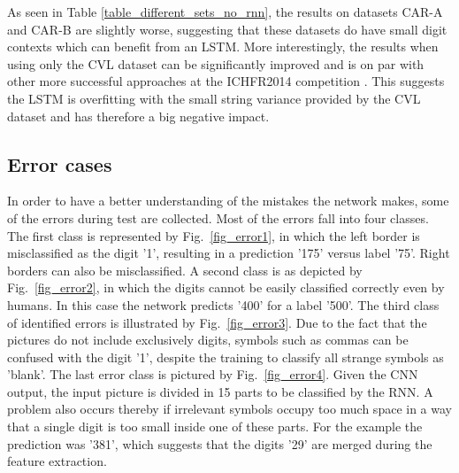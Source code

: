 As seen in Table \ref{table_different_sets_no_rnn}, the results on datasets CAR-A and CAR-B are slightly worse, suggesting that these datasets do have small digit contexts which can benefit from an LSTM. More interestingly, the results when using only the CVL dataset can be significantly improved and is on par with other more successful approaches at the ICHFR2014 competition \cite{icfhr_competition}. This suggests the LSTM is overfitting with the small string variance provided by the CVL dataset and has therefore a big negative impact. 

\subsection{Error cases}

In order to have a better understanding of the mistakes the network makes, some of the errors during test are collected. Most of the errors fall into four classes. The first class is represented by Fig.~\ref{fig_error1}, in which the left border is misclassified as the digit '1', resulting in a prediction '175' versus label '75'. Right borders can also be misclassified. A second class is as depicted by Fig.~\ref{fig_error2}, in which the digits cannot be easily classified correctly even by humans. In this case the network predicts '400' for a label '500'. The third class of identified errors is illustrated by Fig.~\ref{fig_error3}. Due to the fact that the pictures do not include exclusively digits, symbols such as commas can be confused with the digit '1', despite the training to classify all strange symbols as 'blank'. The last error class is pictured by Fig.~\ref{fig_error4}. Given the CNN output, the input picture is divided in 15 parts to be classified by the RNN. A problem also occurs thereby if irrelevant symbols occupy too much space in a way that a single digit is too small inside one of these parts. For the example the prediction was '381', which suggests that the digits '29' are merged during the feature extraction. 

